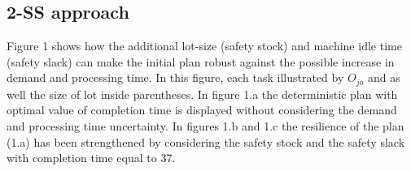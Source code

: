 \documentclass[letterpaper]{article} %
\begin{document}

\subsection{2-SS approach}
Figure 1 shows how the additional lot-size (safety stock) and machine idle time (safety slack) can make the initial plan robust against the possible increase in demand and processing time. In this figure, each task illustrated by $O_{jo}$ and as well the size of lot inside parentheses. In figure 1.a the deterministic plan with optimal value of completion time  is displayed without considering the demand and processing time uncertainty. In figures 1.b and 1.c the resilience of the plan (1.a) has been strengthened by considering the safety stock and the safety slack with completion time equal to 37.
\end{document}
